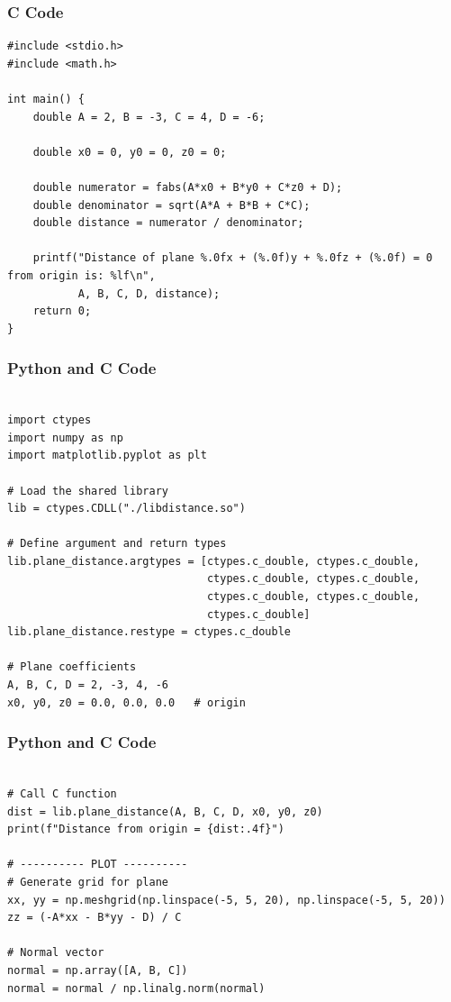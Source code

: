 \documentclass{beamer}
\begin{document}
\begin{frame}[fragile]
\frametitle{C Code}
\begin{lstlisting}
#include <stdio.h>
#include <math.h>

int main() {
    double A = 2, B = -3, C = 4, D = -6;

    double x0 = 0, y0 = 0, z0 = 0;

    double numerator = fabs(A*x0 + B*y0 + C*z0 + D);
    double denominator = sqrt(A*A + B*B + C*C);
    double distance = numerator / denominator;

    printf("Distance of plane %.0fx + (%.0f)y + %.0fz + (%.0f) = 0 from origin is: %lf\n",
           A, B, C, D, distance);
    return 0;
}
\end{lstlisting}

\end{frame}

\begin{frame}[fragile]
\frametitle{Python and C Code}

\begin{lstlisting}

import ctypes
import numpy as np
import matplotlib.pyplot as plt

# Load the shared library
lib = ctypes.CDLL("./libdistance.so")

# Define argument and return types
lib.plane_distance.argtypes = [ctypes.c_double, ctypes.c_double,
                               ctypes.c_double, ctypes.c_double,
                               ctypes.c_double, ctypes.c_double,
                               ctypes.c_double]
lib.plane_distance.restype = ctypes.c_double

# Plane coefficients
A, B, C, D = 2, -3, 4, -6
x0, y0, z0 = 0.0, 0.0, 0.0   # origin
\end{lstlisting}

\end{frame}


\begin{frame}[fragile]
\frametitle{Python and C Code}

\begin{lstlisting}

# Call C function
dist = lib.plane_distance(A, B, C, D, x0, y0, z0)
print(f"Distance from origin = {dist:.4f}")

# ---------- PLOT ----------
# Generate grid for plane
xx, yy = np.meshgrid(np.linspace(-5, 5, 20), np.linspace(-5, 5, 20))
zz = (-A*xx - B*yy - D) / C

# Normal vector
normal = np.array([A, B, C])
normal = normal / np.linalg.norm(normal)
\end{lstlisting}

\end{frame}
\end{document}
